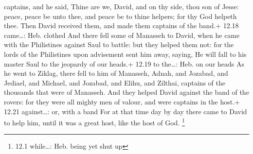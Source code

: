 captains, and he said, Thine are we, David, and on thy side, thou son of
Jesse: peace, peace be unto thee, and peace be to thine helpers; for thy
God helpeth thee. Then David received them, and made them captains of
the band.+ 12.18 came\ldots: Heb. clothed  And there fell
some of Manasseh to David, when he came with the Philistines against
Saul to battle: but they helped them not: for the lords of the
Philistines upon advisement sent him away, saying, He will fall to his
master Saul to the jeopardy of our heads.+ 12.19 to the\ldots: Heb. on
our heads  As he went to Ziklag, there fell to him of
Manasseh, Adnah, and Jozabad, and Jediael, and Michael, and Jozabad, and
Elihu, and Zilthai, captains of the thousands that were of Manasseh.
 And they helped David against the band of the rovers: for
they were all mighty men of valour, and were captains in the host.+
12.21 against\ldots: or, with a band  For at that time day
by day there came to David to help him, until it was a great host, like
the host of God. \footnote{12.1 while\ldots: Heb. being yet shut up}

